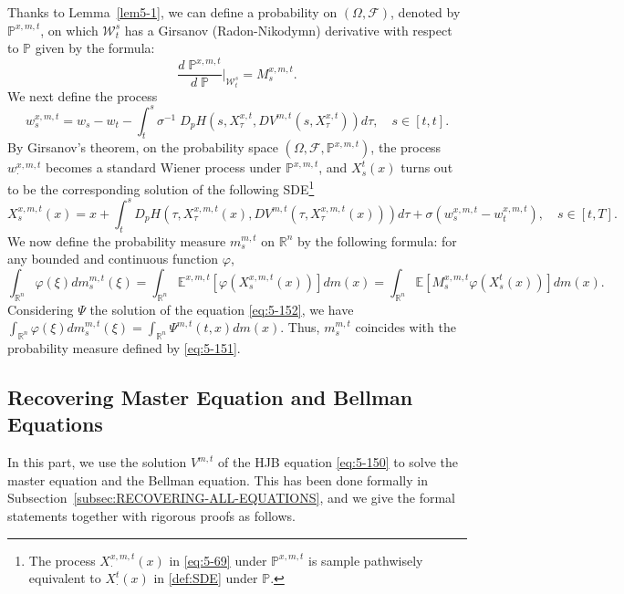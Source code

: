 \documentclass[11pt]{article}
\numberwithin{equation}{section}
\newcommand{\e}{\mathbb{E}}
\newcommand{\brn}{{\mathbb{R}^n}}
\newcommand{\1}{\mbox{1\hspace{-1mm}I}}
\begin{document}
Thanks to Lemma~\ref{lem5-1}, we can define a probability on $(\Omega,\mathcal{F})$, denoted by $\mathbb{P}^{x,m,t}$, on which $\mathcal{W}_{t}^{s}$ has a Girsanov (Radon-Nikodymn) derivative with respect to $\mathbb{P}$ given by the formula: 
\begin{equation*}\label{eq:5-68}
    \dfrac{d\;\mathbb{P}^{x,m,t}}{d\;\mathbb{P}}\bigg|_{\mathcal{W}_{t}^{s}}=M^{x,m,t}_s.
\end{equation*}
We next define the process 
\begin{equation}\label{eq:5-69}
    w^{x,m,t}_s=w_s-w_t-\int_{t}^{s}\sigma^{-1}\; D_p H\left(s,X^{x,t}_\tau,DV^{m,t}\left(s,X^{x,t}_\tau\right)\right)d\tau,\quad s\in[t,t].
\end{equation}
By Girsanov's theorem, on the probability space $\left(\Omega,\mathcal{F},\mathbb{P}^{x,m,t}\right)$, the process $w^{x,m,t}_\cdot$ becomes a standard Wiener process under $\mathbb{P}^{x,m,t}$, and $X^{t}_s(x)$ turns out to be the corresponding solution of the following SDE\footnote{The process $X^{x,m,t}_\cdot(x)$ in \eqref{eq:5-69} under $\mathbb{P}^{x,m,t}$ is sample pathwisely equivalent to $X^t_\cdot(x)$ in \eqref{def:SDE} under $\mathbb{P}$.}
\begin{equation}\label{eq:5-70}
    X^{x,m,t}_s(x)=x+\int_t^s D_p H\left(\tau,X^{x,m,t}_\tau(x),DV^{m,t}\left(\tau,X^{x,m,t}_\tau(x)\right)\right)d\tau+\sigma \left(w^{x,m,t}_s-w^{x,m,t}_t\right),\quad s\in[t,T].
\end{equation}
We now define the probability measure $m^{m,t}_s$ on $\brn$ by the following formula: for any bounded and continuous function $\varphi$,
\begin{equation}\label{eq:5-71}
    \int_{\brn}\varphi(\xi)dm^{m,t}_s (\xi)=\int_{\brn}\e^{x,m,t}\left[\varphi\left(X^{x,m,t}_s(x)\right)\right]dm(x)=\int_{\brn}\e \left[M^{x,m,t}_s\varphi\left(X^{t}_s(x)\right)\right]dm(x).
\end{equation}
Considering $\Psi$ the solution of the equation \eqref{eq:5-152}, we have $\int_{\brn}\varphi(\xi)dm^{m,t}_s(\xi)=\int_{\brn}\Psi^{m,t}(t,x)dm(x)$. Thus, $m^{m,t}_s$ coincides with the probability measure defined by \eqref{eq:5-151}. 

\subsection{Recovering Master Equation and Bellman Equations}

In this part, we use the solution $V^{m,t}$ of the HJB equation \eqref{eq:5-150} to solve the master equation and the Bellman equation. This has been done formally in Subsection~\ref{subsec:RECOVERING-ALL-EQUATIONS}, and we give the formal statements together with rigorous proofs as follows. 
\end{document}
